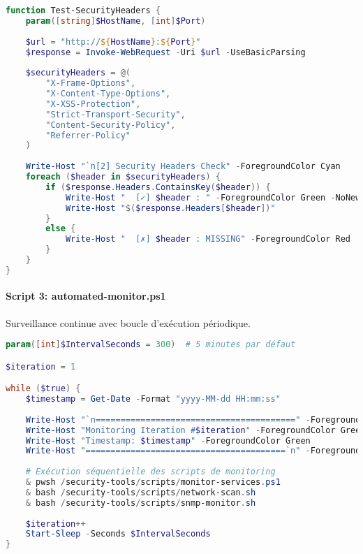 \begin{lstlisting}[language=PowerShell, caption=Vérification des Headers de Sécurité, basicstyle=\ttfamily\tiny]
function Test-SecurityHeaders {
    param([string]$HostName, [int]$Port)
    
    $url = "http://${HostName}:${Port}"
    $response = Invoke-WebRequest -Uri $url -UseBasicParsing
    
    $securityHeaders = @(
        "X-Frame-Options",
        "X-Content-Type-Options",
        "X-XSS-Protection",
        "Strict-Transport-Security",
        "Content-Security-Policy",
        "Referrer-Policy"
    )
    
    Write-Host "`n[2] Security Headers Check" -ForegroundColor Cyan
    foreach ($header in $securityHeaders) {
        if ($response.Headers.ContainsKey($header)) {
            Write-Host "  [✓] $header : " -ForegroundColor Green -NoNewline
            Write-Host "$($response.Headers[$header])"
        }
        else {
            Write-Host "  [✗] $header : MISSING" -ForegroundColor Red
        }
    }
}
\end{lstlisting}

\paragraph{Script 3: automated-monitor.ps1}
Surveillance continue avec boucle d'exécution périodique.

\begin{lstlisting}[language=PowerShell, caption=Monitoring Automatisé, basicstyle=\ttfamily\tiny]
param([int]$IntervalSeconds = 300)  # 5 minutes par défaut

$iteration = 1

while ($true) {
    $timestamp = Get-Date -Format "yyyy-MM-dd HH:mm:ss"
    
    Write-Host "`n========================================" -ForegroundColor Green
    Write-Host "Monitoring Iteration #$iteration" -ForegroundColor Green
    Write-Host "Timestamp: $timestamp" -ForegroundColor Green
    Write-Host "========================================`n" -ForegroundColor Green
    
    # Exécution séquentielle des scripts de monitoring
    & pwsh /security-tools/scripts/monitor-services.ps1
    & bash /security-tools/scripts/network-scan.sh
    & bash /security-tools/scripts/snmp-monitor.sh
    
    $iteration++
    Start-Sleep -Seconds $IntervalSeconds
}
\end{lstlisting}


